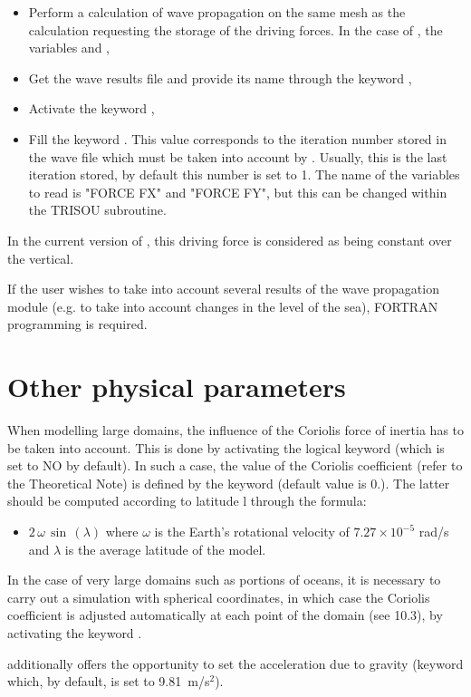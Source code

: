 \begin{itemize}
\item  Perform a calculation of wave propagation on the same mesh as the
 calculation requesting the storage of the driving forces. In the
case of \tomawac, the variables  and ,

\item  Get the wave results file and provide its name through the keyword
,

\item  Activate the keyword ,

\item  Fill the keyword . This value
corresponds to the iteration number stored in the wave file which must be taken
into account by . Usually, this is the last iteration stored, by
default this number is set to 1. The name of the variables to read is "FORCE
FX" and "FORCE FY", but this can be changed within the TRISOU subroutine.
\end{itemize}

In the current version of , this driving force is considered as being
constant over the vertical.

If the user wishes to take into account several results of the wave propagation
module (e.g. to take into account changes in the level of the sea), FORTRAN
programming is required.

\section{Other physical parameters}

When modelling large domains, the influence of the Coriolis force of inertia
has to be taken into account. This is done by activating the logical keyword
 (which is set to NO by default). In such a case, the value of
the Coriolis coefficient (refer to the Theoretical Note) is defined by the
keyword  (default value is 0.). The latter should
be computed according to latitude l through the formula:

\begin{itemize}
\item  $2\, \omega \, \sin \, \left(\lambda \right)$ where $\omega$ is the
Earth's rotational velocity of $7.27 \times {10}^{-5}$ rad/s and $\lambda$ is the
average latitude of the model.
\end{itemize}

In the case of very large domains such as portions of oceans, it is necessary
to carry out a simulation with spherical coordinates, in which case the
Coriolis coefficient is adjusted automatically at each point of the domain (see
10.3), by activating the keyword .

 additionally offers the opportunity to set the acceleration due to
gravity (keyword  which, by
default, is set to 9.81~m/s${}^{2}$).
